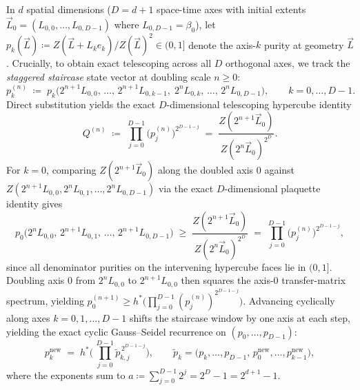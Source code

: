 \documentclass[11pt,a4paper]{article}
\theoremstyle{definition}
\begin{document}
In $d$ spatial dimensions ($D = d+1$ space-time axes with initial extents $\vec{L}_0 = (L_{0,0},\dots,L_{0,D-1})$ where $L_{0,D-1} = \beta_0$), let $p_k(\vec{L}) \coloneqq Z(\vec{L} + L_k e_k) / Z(\vec{L})^2 \in (0,1]$ denote the axis-$k$ purity at geometry $\vec{L}$. Crucially, to obtain exact telescoping across all $D$ orthogonal axes, we track the \emph{staggered staircase} state vector at doubling scale $n \ge 0$:
\begin{equation}
  p_k^{(n)} \;\coloneqq\; p_k\!\bigl(2^{n+1} L_{0,0},\,\dots,\, 2^{n+1} L_{0,k-1},\; 2^n L_{0,k},\,\dots,\, 2^n L_{0,D-1}\bigr),
  \qquad k = 0,\dots,D-1.
  \label{eq:D_staircase}
\end{equation}
Direct substitution yields the exact $D$-dimensional telescoping hypercube identity
\begin{equation}
  Q^{(n)} \;\coloneqq\; \prod_{j=0}^{D-1} \bigl(p_j^{(n)}\bigr)^{2^{D-1-j}}
  \;=\; \frac{Z(2^{n+1}\vec{L}_0)}{Z(2^n \vec{L}_0)^{2^D}}.
  \label{eq:D_telescope}
\end{equation}
For $k=0$, comparing $Z(2^{n+1}\vec{L}_0)$ along the doubled axis $0$ against $Z(2^{n+1}L_{0,0}, 2^n L_{0,1},\dots,2^n L_{0,D-1})$ via the exact $D$-dimensional plaquette identity gives
\[
  p_0\!\bigl(2^n L_{0,0},\, 2^{n+1} L_{0,1},\,\dots,\, 2^{n+1} L_{0,D-1}\bigr)
  \;\ge\; \frac{Z(2^{n+1}\vec{L}_0)}{Z(2^n \vec{L}_0)^{2^D}}
  \;=\; \prod_{j=0}^{D-1} \bigl(p_j^{(n)}\bigr)^{2^{D-1-j}},
\]
since all denominator purities on the intervening hypercube faces lie in $(0,1]$. Doubling axis $0$ from $2^n L_{0,0}$ to $2^{n+1} L_{0,0}$ then squares the axis-$0$ transfer-matrix spectrum, yielding $p_0^{(n+1)} \ge h^*\bigl(\prod_{j=0}^{D-1} (p_j^{(n)})^{2^{D-1-j}}\bigr)$. Advancing cyclically along axes $k = 0, 1, \dots, D-1$ shifts the staircase window by one axis at each step, yielding the exact cyclic Gauss--Seidel recurrence on $(p_0,\dots,p_{D-1})$:
\begin{equation}
  p_k^{\mathrm{new}} \;=\; h^*\!\Biggl(\,\prod_{j=0}^{D-1} \tilde{p}_{k,j}^{\,2^{D-1-j}}\Biggr), \qquad
  \tilde{p}_{k} = \bigl(p_k,\dots,p_{D-1},\, p_0^{\mathrm{new}},\dots,p_{k-1}^{\mathrm{new}}\bigr),
  \label{eq:D_gs_step}
\end{equation}
where the exponents sum to $a \coloneqq \sum_{j=0}^{D-1} 2^j = 2^D - 1 = 2^{d+1} - 1$.
\end{document}
